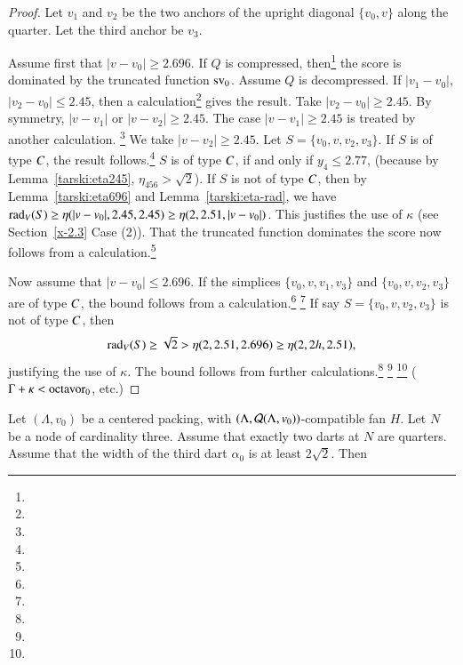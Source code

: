 \begin{proof}
Let $v_1$ and $v_2$ be the two anchors of the upright diagonal $\{v_0,v\}$
along the quarter. Let the third anchor be $v_3$.

Assume first that $|v-v_0|\ge 2.696$. If $Q$ is compressed,
then\footnote{} %
the score is dominated by the truncated
function ${\operatorname{sv}}_0$.  Assume $Q$ is decompressed. If $|v_1-v_0|$,
$|v_2-v_0|\le 2.45$, then a calculation\footnote{} %
gives the result. Take $|v_2-v_0|\ge
2.45$.  By symmetry, $|v-v_1|$ or $|v-v_2|\ge 2.45$. The case
$|v-v_1|\ge2.45$ is treated by another calculation.%
\footnote{} %
We take
$|v-v_2|\ge2.45$. Let $S=\{v_0,v,v_2,v_3\}$. If $S$ is of type $C$,
the result follows.\footnote{} %
$S$ is of type $C$, if and only if $y_4\le 2.77$, (because
by Lemma~\ref{tarski:eta245}, $\eta_{456}>\sqrt2$).
If $S$ is  not of type $C$, then by Lemma~\ref{tarski:eta696} and
Lemma~\ref{tarski:eta-rad},
we have $\operatorname{rad}_V(S) \ge\eta(|v-v_0|,2.45,2.45)\ge \eta(2,2.51,|v-v_0|)$.
This justifies the use of $\kappa$ (see Section~\ref{x-2.3}
Case (2)). That the truncated function dominates the score now
follows from a calculation.\footnote{} %

Now assume that $|v-v_0|\le 2.696$. If the simplices $\{v_0,v,v_1,v_3\}$
and $\{v_0,v,v_2,v_3\}$ are of type $C$, the bound follows from a
calculation.\footnote{} %
\footnote{} %
If say  $S=\{v_0,v,v_2,v_3\}$ is not of type $C$,
then
    $$\operatorname{rad}_V(S)\ge\sqrt2>  \eta(2,2.51,2.696)\ge\eta(2,2h,2.51),$$
justifying the use of $\kappa$. The bound follows from further
calculations.\footnote{} %
\footnote{} %
\footnote{} %
($\Gamma+\kappa <\operatorname{octavor}_0$,
etc.)
\end{proof}


\begin{lemma}
    \label{lemma:unerased}
Let $(\Lambda,v_0)$ be a centered packing, 
with $(\Lambda,{\mathcal Q}(\Lambda,v_0))$-compatible fan $H$.
Let $N$ be a node
of cardinality three.  Assume that exactly two darts at $N$
are quarters.  Assume that the width of the third dart $\alpha_0$
is at least $2\sqrt2$.
Then 
\end{lemma}

